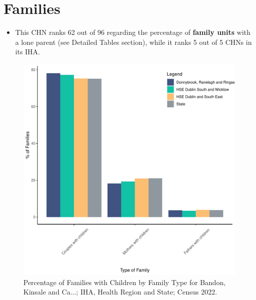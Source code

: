 \documentclass{article}
\begin{document}
\section{Families}\label{sect:Fam}
\begin{itemize}
\item This CHN ranks  62 out of 96 regarding the percentage of \textbf{family units} with a lone parent (see Detailed Tables section), while it ranks   5 out of 5 CHNs in its IHA.
\end{itemize}
\begin{figure}[H]
	\centering
	\includegraphics[width = 150mm]{../figures/FamED.pdf}
	\caption{Percentage of Families with Children by Family Type for Bandon, Kinsale and Ca...; IHA, Health Region and State; Census 2022.}
	\label{fig:vbnv}
	\end{figure}
	
\end{document}
